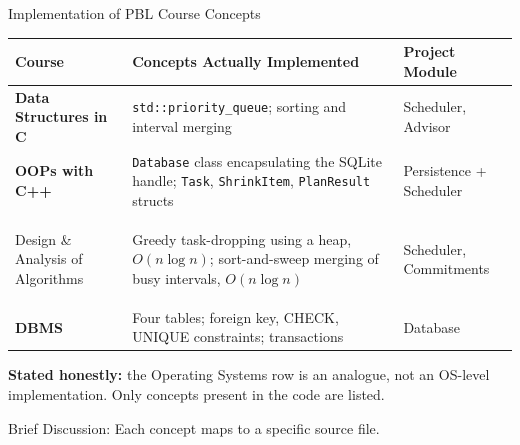 \documentclass[aspectratio=169,11pt]{beamer}
\newcommand{\smallnote}[1]{%
\vspace{0.08cm}
{\scriptsize\color{GEUGrey}#1}
}
\begin{document}
\begin{frame}{Implementation of PBL Course Concepts}

\scriptsize

\begin{center}

\renewcommand{\arraystretch}{1.25}

\begin{tabularx}{.96\textwidth}
{@{}>{\bfseries}p{2.6cm}X p{2.6cm}@{}}

\toprule
Course & Concepts Actually Implemented & Project Module\\
\midrule

Data Structures in C &
\texttt{std::priority\_queue}; sorting and interval merging &
Scheduler, Advisor\\

OOPs with C++ &
\texttt{Database} class encapsulating the SQLite handle; \texttt{Task},
\texttt{ShrinkItem}, \texttt{PlanResult} structs &
Persistence + Scheduler\\

\midrule

Design \& Analysis of Algorithms &
Greedy task-dropping using a heap, $O(n \log n)$; sort-and-sweep merging of
busy intervals, $O(n \log n)$ &
Scheduler, Commitments\\

DBMS &
Four tables; foreign key, CHECK, UNIQUE constraints; transactions &
Database\\

\bottomrule

\end{tabularx}

\end{center}

\vfill

\begin{center}
\colorbox{GEULightBlue}{
\parbox{.88\textwidth}{
\centering
\textbf{Stated honestly:}
the Operating Systems row is an analogue, not an OS-level implementation.
Only concepts present in the code are listed.
}}
\end{center}

\smallnote{
Brief Discussion: Each concept maps to a specific source file.
}

\end{frame}
\end{document}
